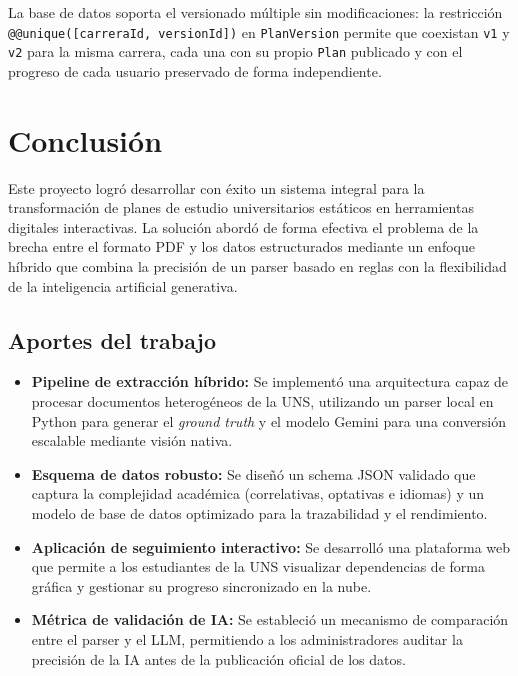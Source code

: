 \documentclass[12pt, a4paper]{report}
\begin{document}
La base de datos soporta el versionado múltiple sin modificaciones: la restricción
\texttt{@@unique([carreraId, versionId])} en \texttt{PlanVersion} permite que coexistan
\texttt{v1} y \texttt{v2} para la misma carrera, cada una con su propio \texttt{Plan}
publicado y con el progreso de cada usuario preservado de forma independiente.

\chapter{Conclusión}
\label{cap:conclusiones}

Este proyecto logró desarrollar con éxito un sistema integral para la transformación de
planes de estudio universitarios estáticos en herramientas digitales interactivas. La
solución abordó de forma efectiva el problema de la brecha entre el formato PDF y los datos
estructurados mediante un enfoque híbrido que combina la precisión de un parser basado en
reglas con la flexibilidad de la inteligencia artificial generativa.

\section{Aportes del trabajo}

\begin{itemize}
  \item \textbf{Pipeline de extracción híbrido:} Se implementó una arquitectura capaz de
        procesar documentos heterogéneos de la UNS, utilizando un parser local en Python
        para generar el \textit{ground truth} y el modelo Gemini para una conversión
        escalable mediante visión nativa.

  \item \textbf{Esquema de datos robusto:} Se diseñó un schema JSON validado que captura
        la complejidad académica (correlativas, optativas e idiomas) y un modelo de base de
        datos optimizado para la trazabilidad y el rendimiento.

  \item \textbf{Aplicación de seguimiento interactivo:} Se desarrolló una plataforma web
        que permite a los estudiantes de la UNS visualizar dependencias de forma gráfica y
        gestionar su progreso sincronizado en la nube.

  \item \textbf{Métrica de validación de IA:} Se estableció un mecanismo de comparación
        entre el parser y el LLM, permitiendo a los administradores auditar la precisión de
        la IA antes de la publicación oficial de los datos.
\end{itemize}
\end{document}
